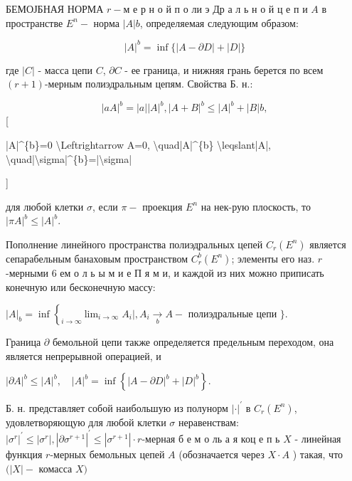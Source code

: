 \documentclass[10pt]{article}
\begin{document}
БЕМОЈБНАЯ НОРМА $r-м$ е р н о й п о ли э Др а л ь н о й ц е п и $A$ в пространстве $E^{n}-$ норма $|A| b$, определяемая следующим образом:



\[

|A|^{b}=\inf \{|A-\partial D|+|D|\}

\]



где $|C|$ - масса цепи $C$, $\partial C$ - ее граница, и нижняя грань берется по всем $(r+1)$-мерным полиэдральным цепям. Свойства Б. н.:



\[

|a A|^{b}=|a||A|^{b},|A+B|^{b} \leqslant|A|^{b}+|B| b,

\][



|A|\^{}\{b\}=0 \textbackslash Leftrightarrow A=0, \textbackslash quad|A|\^{}\{b\} \textbackslash leqslant|A|, \textbackslash quad|\textbackslash sigma|\^{}\{b\}=|\textbackslash sigma|

]



для любой клетки $\sigma$, если $\pi-$ проекция $E^{n}$ на нек-рую плоскость, то $|\pi A|^{b} \leqslant|A|^{b}$.



Пополнение линейного пространства полиэдральных цепей $C_{r}\left(E^{n}\right)$ является сепарабельным банаховым пространством $C_{r}^{b}\left(E^{n}\right)$; элементы его наз. $r$-мерными 6 ем о л ь ы м и е П я м и, и каждой из них можно приписать конечную или бесконечную массу:



$|A|_{b}=\inf \left\{\underset{i \rightarrow \infty}{ } \lim _{i \rightarrow \infty} A_{i} \mid, A_{i} \underset{b}{\longrightarrow} A-\right.$ полиэдральные цепи $\}$.



Граница $\partial$ бемольной цепи также определяется предельным переходом, она является непрерывной операцией, и



$|\partial A|^{b} \leqslant|A|^{b}, \quad|A|^{b}=\inf \left\{|A-\partial D|^{b}+|D|^{b}\right\}$.



Б. н. представляет собой наибольшую из полунорм $|\cdot|^{\prime}$ в $C_{r}\left(E^{n}\right)$, удовлетворяющую для любой клетки $\sigma$ неравенствам: $\left|\sigma^{r}\right|^{\prime} \leqslant\left|\sigma^{r}\right|,\left|\partial \sigma^{r+1}\right|^{\prime} \leqslant\left|\sigma^{r+1}\right| \cdot r$-мерная б е м о ль а я коц е п ь $X$ - линейная функция $r$-мерных бемольных цепей $A$ (обозначается через $X \cdot A$ ) такая, что $(|X|-$ комасса $X)$
\end{document}
